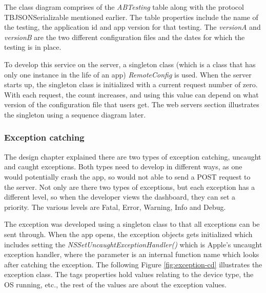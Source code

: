 The class diagram comprises of the \textit{ABTesting} table along with the protocol TBJSONSerializable mentioned earlier. The table properties include the name of the testing, the application id and app version for that testing. The \textit{versionA} and \textit{versionB} are the two different configuration files and the dates for which the testing is in place.

To develop this service on the server, a singleton class (which is a class that has only one instance in the life of an app) \textit{RemoteConfig} is used. When the server starts up, the singleton class is initialized with a current request number of zero. With each request, the count increases, and using this value can depend on what version of the configuration file that users get. The web servers section illustrates the singleton using a sequence diagram later.


\subsubsection{Exception catching} \label{dev:sub_exception}

The design chapter explained there are two types of exception catching, uncaught and caught exceptions. Both types need to develop in different ways, as one would potentially crash the app, so would not able to send a POST request to the server. Not only are there two types of exceptions, but each exception has a different level, so when the developer views the dashboard, they can set a priority. The various levels are Fatal, Error, Warning, Info and Debug.

The exception was developed using a singleton class to that all exceptions can be sent through. When the app opens, the exception objects gets initialized which includes setting the \textit{NSSetUncaughtExceptionHandler()} which is Apple’s uncaught exception handler, where the parameter is an internal function name which looks after catching the exception. The following Figure \ref{fig:exception-cd} illustrates the exception class. The tags properties hold values relating to the device type, the OS running, etc., the rest of the values are about the exception values.

